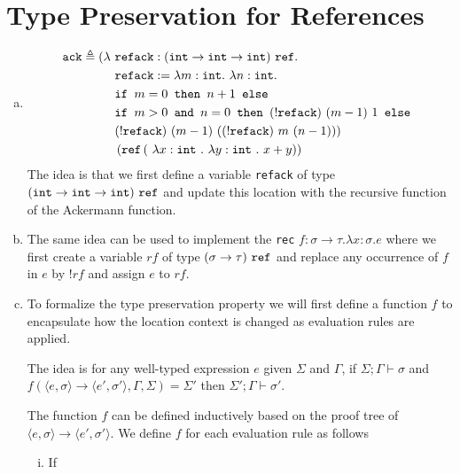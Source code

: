 \section{Type Preservation for References}

\begin{enumerate}[(a)]
\item
\begin{align*}
\texttt{ack} \triangleq ( \lambda ~ &\texttt{refack}:(\texttt{int} \rightarrow \texttt{int} \rightarrow \texttt{int}) ~ \texttt{ref} .\\
&\texttt{refack} := \lambda m : \texttt{int}. ~ \lambda n : \texttt{int} . ~ \\
&\texttt{if } m = 0 \texttt{ then } n+1 \texttt{ else}\\
&\texttt{if } m>0 \texttt{ and } n = 0 \texttt{ then } (!\texttt{refack}) ~ (m-1) ~1 \texttt{ else } \\
&(!\texttt{refack}) ~ (m-1) ~ ((!\texttt{refack}) ~ m ~ (n-1)) ) \\
&\left ( \texttt{ref} \left ( ~ \lambda x : \texttt{int}~.~\lambda y : \texttt{int}~.~ x+ y \right ) \right )
\end{align*}
The idea is that we first define a variable \texttt{refack} of type $(\texttt{int} \rightarrow \texttt{int} \rightarrow \texttt{int}) ~ \texttt{ref}$ and update this location with the recursive function of the Ackermann function.
\item The same idea can be used to implement the \texttt{rec} $f : \sigma \rightarrow \tau.\lambda x : \sigma.e$ where we first create a variable $rf$ of type $(\sigma \rightarrow \tau)~\texttt{ref}$ and replace any occurrence of $f$ in $e$ by $!rf$ and assign $e$ to $rf$.
\item To formalize the type preservation property we will first define a function $f$ to encapsulate how the location context is changed as evaluation rules are applied. 

The idea is for any well-typed expression $e$ given $\Sigma$ and $\Gamma$, if $\Sigma; \Gamma \vdash \sigma$ and $f(
  \langle e, \sigma \rangle \rightarrow \langle e', \sigma' \rangle,
  \Gamma, 
  \Sigma) = \Sigma'$ then $\Sigma'; \Gamma \vdash \sigma'$. 

The function $f$ can be defined inductively based on the proof tree of $\langle e, \sigma \rangle \rightarrow \langle e', \sigma' \rangle$. We define $f$ for each evaluation rule as follows
\begin{enumerate}[i.]
\item If 


\end{enumerate}
\end{enumerate}
